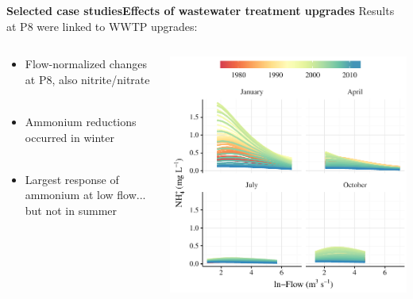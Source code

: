 \documentclass[serif]{beamer}\usepackage[]{graphicx}\usepackage[]{color}
\begin{document}
\begin{frame}{\textbf{Selected case studies}}{\textbf{Effects of wastewater treatment upgrades}}
Results at P8 were linked to WWTP upgrades:
\begin{columns}
\begin{column}{0.45\textwidth}
\begin{itemize}
\item Flow-normalized changes at P8, also nitrite/nitrate \\~\\
\item Ammonium reductions occurred in winter \\~\\
\item Largest response of ammonium at low flow... but not in summer
\end{itemize}
\end{column}
\begin{column}{0.4\textwidth}
\vspace{0.3in}
\centerline{\includegraphics[width = \textwidth]{fig/p8dyna_thumb.pdf}}
\end{column}
\end{columns}
\end{frame}
\end{document}

